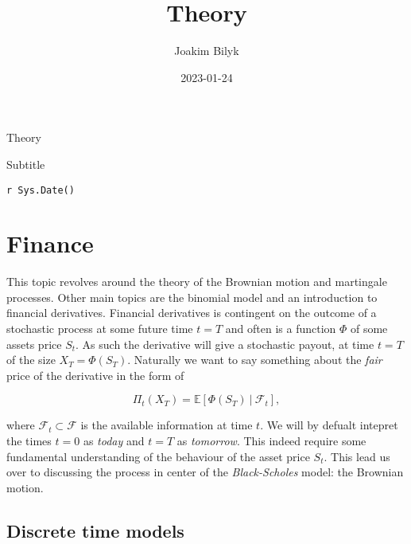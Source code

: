 \documentclass[
]{article}
\title{Theory}
\author{Joakim Bilyk}
\date{2023-01-24}
\begin{document}
\maketitle

{
\setcounter{tocdepth}{4}
\tableofcontents
}
\vspace*{-3cm}

\begin{center}
\end{center}

\vspace*{2cm}

\noindent \Huge Theory

\noindent \huge Subtitle

\vspace*{2cm}

\normalsize

\noindent \texttt{r\ Sys.Date()}

\clearpage

\hypertarget{finance}{%
\section{Finance}\label{finance}}

This topic revolves around the theory of the Brownian motion and
martingale processes. Other main topics are the binomial model and an
introduction to financial derivatives. Financial derivatives is
contingent on the outcome of a stochastic process at some future time
\(t=T\) and often is a function \(\Phi\) of some assets price \(S_t\).
As such the derivative will give a stochastic payout, at time \(t=T\) of
the size \(X_T=\Phi(S_T)\). Naturally we want to say something about the
\emph{fair} price of the derivative in the form of

\[\Pi_t(X_T)=\mathbb{E}\left[\Phi(S_T)\ \vert\ \mathcal{F}_t\right],\]

where \(\mathcal{F}_t\subset\mathcal{F}\) is the available information
at time \(t\). We will by defualt intepret the times \(t=0\) as
\emph{today} and \(t=T\) as \emph{tomorrow}. This indeed require some
fundamental understanding of the behaviour of the asset price \(S_t\).
This lead us over to discussing the process in center of the
\emph{Black-Scholes} model: the Brownian motion.

\hypertarget{discrete-time-models}{%
\subsection{Discrete time models}\label{discrete-time-models}}
\end{document}
